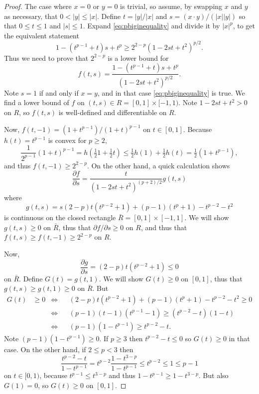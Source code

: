 \documentclass[final,leqno,onefignum,onetabnum]{siamltex1213bueler}
\begin{document}
\begin{proof}  The case where $x=0$ or $y=0$ is trivial, so assume, by swapping $x$ and $y$ as necessary, that $0 < |y| \le |x|$.  Define $t=|y|/|x|$ and $s = (x\cdot y)/(|x||y|)$ so that $0\le t \le 1$ and $|s|\le 1$.  Expand \eqref{eq:pbiginequality} and divide it by $|x|^p$, to get the equivalent statement
    $$1 - (t^{p-1}+t) s + t^p \ge 2^{2-p} \left(1 - 2 s t + t^2\right)^{p/2}.$$
Thus we need to prove that $2^{2-p}$ is a lower bound for
	$$f(t,s) = \frac{1 - (t^{p-1}+t) s + t^p}{\left(1 - 2 s t + t^2\right)^{p/2}}.$$
Note $s=1$ if and only if $x=y$, and in that case \eqref{eq:pbiginequality} is true.  We find a lower bound of $f$ on $(t,s) \in R=[0,1]\times[-1,1)$.  Note $1-2st+t^2 > 0$ on $ R$, so $f(t,s)$ is well-defined and differentiable on $R$.

Now, $f(t,-1) = \left(1 + t^{p-1}\right) / \left(1 + t\right)^{p-1}$ on $t\in[0,1]$.  Because $h(t)=t^{p-1}$ is convex for $p \ge 2$,
    $$\frac{1}{2^{p-1}} (1+t)^{p-1} = h(\tfrac{1}{2} 1 + \tfrac{1}{2} t) \le \tfrac{1}{2} h(1) + \tfrac{1}{2} h(t) = \tfrac{1}{2} (1 + t^{p-1}),$$
and thus $f(t,-1) \ge 2^{2-p}$.  On the other hand, a quick calculation shows
    $$\frac{\partial f}{\partial s} = \frac{t}{\left(1 - 2 s t + t^2\right)^{(p+2)/2}} g(t,s)$$
where
    $$g(t,s) = s(2-p) t (t^{p-2} + 1) + (p-1) (t^p+1) - t^{p-2} - t^2$$
is continuous on the closed rectangle $\bar R = [0,1]\times[-1,1]$.  We will show $g(t,s)\ge 0$ on $\bar R$, thus that $\partial f/\partial s \ge 0$ on $R$, and thus that $f(t,s)\ge f(t,-1) \ge  2^{2-p}$ on $R$.

Now,
    $$\frac{\partial g}{\partial s} = (2-p) t (t^{p-2} + 1) \le 0$$
on $\bar R$.  Define $G(t) = g(t,1)$.  We will show $G(t)\ge 0$ on $[0,1]$, thus that $g(t,s)\ge g(t,1)\ge 0$ on $\bar R$.  But
\begin{align*}
G(t) &\ge 0 &\iff && (2-p) t (t^{p-2} + 1) + (p-1) (t^p+1) - t^{p-2} - t^2 \ge 0 \\
          & &\iff && (p-1) (t-1) (t^{p-1}-1) \ge (t^{p-2} - t) (1 - t)  \\
          & &\iff && (p-1) (1 - t^{p-1}) \ge t^{p-2} - t.
\end{align*}
Note $(p-1) (1 - t^{p-1}) \ge 0$.  If $p\ge 3$ then $t^{p-2} - t \le 0$ so $G(t)\ge 0$ in that case.  On the other hand, if $2\le p < 3$ then
	$$\frac{t^{p-2} - t}{1 - t^{p-1}} = t^{p-2} \frac{1 - t^{3-p}}{1 - t^{p-1}} \le t^{p-2} \le 1 \le p-1$$
on $t\in[0,1)$, because $t^{p-1}\le t^{3-p}$ and thus $1 - t^{p-1} \ge 1 - t^{3-p}$.  But also $G(1)=0$, so $G(t)\ge 0$ on $[0,1]$. \end{proof}
\end{document}
